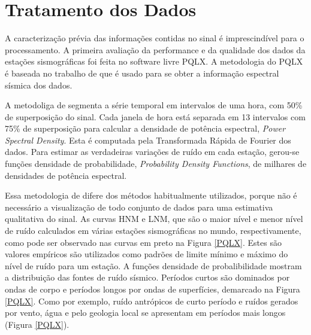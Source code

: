 \section{Tratamento dos Dados}

A caracterização prévia das informações contidas no sinal é imprescindível para o processamento. A primeira avaliação da performance e da qualidade dos dados da estações sismográficas foi feita no software livre PQLX.  A metodologia do PQLX é baseada no trabalho de \cite{McNamara_Buland_2004} que é usado para se obter a informação espectral sísmica dos dados.

A metodoliga de \cite{McNamara_Buland_2004} segmenta a série temporal em intervalos de uma hora, com 50\% de superposição do sinal. Cada janela de hora está separada em 13 intervalos com 75\% de superposição para calcular a densidade de potência espectral, \textit{Power Spectral Density}. Esta é computada pela Transformada Rápida de Fourier dos dados. Para estimar as verdadeiras variações de ruído em cada estação, gerou-se  funções densidade de probabilidade, \textit{Probability Density Functions}, de milhares de densidades de potência espectral.

Essa metodologia de \cite{McNamara_Buland_2004} difere dos métodos habitualmente utilizados, porque não é necessário a visualização de todo conjunto de dados para uma estimativa qualitativa do sinal.  As curvas HNM e LNM, que são o maior nível e menor nível de ruído calculados em várias estações sismográficas no mundo, respectivamente, como pode ser observado nas curvas em preto na Figura \ref{PQLX}. Estes são valores empíricos são utilizados como padrões de limite mínimo e máximo do nível de ruído para um estação. A funções densidade de probalibilidade mostram a distribuição das fontes de ruído sísmico. Períodos curtos são dominados por ondas de corpo e períodos longos por ondas de superfícies, demarcado na Figura \ref{PQLX}. Como por exemplo, ruído antrópicos de curto período e ruídos gerados por vento, água e pelo geologia local se apresentam em períodos mais longos (Figura \ref{PQLX}).

